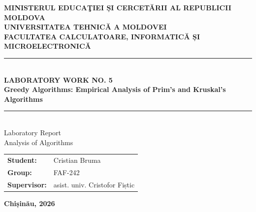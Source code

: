 \documentclass[12pt, a4paper]{report}
\newcommand{\ReportTitle}{Laboratory Work No. 5}
\newcommand{\ReportSubtitle}{Greedy Algorithms: Empirical Analysis of Prim's and Kruskal's Algorithms}
\newcommand{\StudentName}{Cristian Bruma}
\newcommand{\GroupName}{FAF-242}
\newcommand{\SupervisorName}{asist. univ. Cristofor Fiștic}
\newcommand{\Ministry}{Ministerul Educaţiei și Cercetării al Republicii Moldova}
\newcommand{\UniversityName}{Universitatea Tehnică a Moldovei}
\newcommand{\DepartmentName}{Facultatea Calculatoare, Informatică și Microelectronică}
\newcommand{\AcademicYear}{2026}
\begin{document}
\begin{titlepage}
  \thispagestyle{empty}        %
  \begin{center}
    \textbf{\MakeUppercase{\Ministry}}\\[4pt]
    \textbf{\MakeUppercase{\UniversityName}}\\[4pt]
    \textbf{\MakeUppercase{\DepartmentName}}\\[40pt]

    \rule{\linewidth}{0.5pt}\\[6pt]
    {\Large\bfseries\MakeUppercase{\ReportTitle}}\\[4pt]
    {\large\bfseries\ReportSubtitle}\\[6pt]
    \rule{\linewidth}{0.5pt}\\[30pt]

    {\Large Laboratory Report}\\[4pt]
    {\Large Analysis of Algorithms}\\[60pt]
  \end{center}

  \begin{flushleft}
    \begin{tabular}{ll}
      \Large\textbf{Student:}    & \Large\StudentName \\
      \Large\textbf{Group:}      & \Large\GroupName   \\
      \Large\textbf{Supervisor:} & \Large\SupervisorName \\
    \end{tabular}
  \end{flushleft}

  \vfill
  \begin{center}
    \Large\textbf{Chișinău, \AcademicYear}
  \end{center}
\end{titlepage}

\setcounter{page}{1}

\newpage
\renewcommand{\contentsname}{TABLE OF CONTENTS}
\renewcommand{\cfttoctitlefont}{\hfill\fontsize{13pt}{15pt}\bfseries}
\renewcommand{\cftaftertoctitle}{\hfill}
\tableofcontents
\thispagestyle{plain}          %

\end{document}
